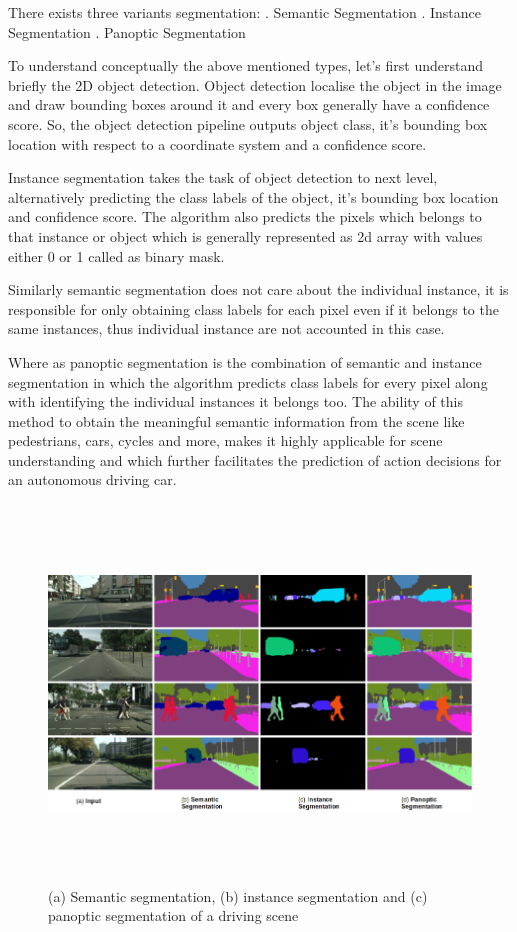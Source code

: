     There exists three variants segmentation: . Semantic Segmentation . Instance Segmentation . Panoptic Segmentation \newline 
     
     To understand conceptually the above mentioned types, let's first understand briefly the  2D object detection. Object detection localise the object in the image and draw bounding boxes around it and every box generally have a confidence score. So, the object detection pipeline outputs object class, it's bounding box location with respect to a coordinate system and a confidence score. 
     
     Instance segmentation takes the task of object detection to next level, alternatively predicting the class labels of the object, it's bounding box location and confidence score. The algorithm also predicts the pixels which belongs to that instance or object which is generally represented as 2d array with values either 0 or 1 called as binary mask. 
     
     Similarly semantic segmentation does not care about the individual instance, it is responsible for only obtaining class labels for each pixel even if it belongs to the same instances, thus individual instance are not accounted in this case. 

     Where as panoptic segmentation is the combination of semantic and instance segmentation in which the algorithm predicts class labels for every pixel along with identifying the individual instances it belongs too. 
    \newline
    The ability of this method to obtain the meaningful semantic information from the scene like pedestrians, cars, cycles and more, makes it highly applicable for scene understanding and which further facilitates the prediction of action decisions for an autonomous driving car.  
    
     \begin{figure}[h]
    \centering
    \includegraphics[width=\textwidth, height =10cm]{images/seg_image101.png}
    \caption{ \cite{8570006} (a) Semantic segmentation, (b) instance segmentation and (c) panoptic segmentation of a driving scene }
    \end{figure}

